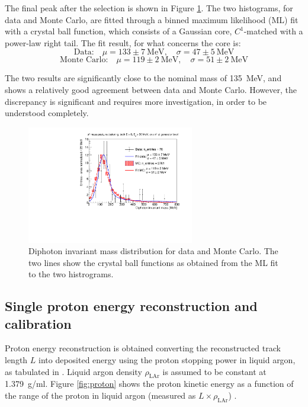 The final peak after the selection is shown in Figure \ref{fig:pi0_mass_peak}. The two histograms, for data and Monte Carlo, are fitted through a binned maximum likelihood (ML) fit with a crystal ball function, which consists of a Gaussian core, $C^1$-matched with a power-law right tail. The fit result, for what concerns the core is:
\[ \text{Data:} \quad \mu = 133 \pm 7~\text{MeV}, \quad \sigma = 47 \pm 5~\text{MeV} \]
\[ \text{Monte Carlo:} \quad \mu = 119 \pm 2~\text{MeV}, \quad \sigma = 51 \pm 2~\text{MeV} \]

The two results are significantly close to the nominal mass of 135~MeV, and shows a relatively good agreement between data and Monte Carlo. However, the discrepancy is significant and requires more investigation, in order to be understood completely.

\begin{figure}[htbp]
\centering
\includegraphics[width=0.65\textwidth]{figures/pi0_mass_peak_final.pdf}
\caption{Diphoton invariant mass distribution for data and Monte Carlo. The two lines show the crystal ball functions as obtained from the ML fit to the two histrograms.} 
\label{fig:pi0_mass_peak}
\end{figure}

\subsection{Single proton energy reconstruction and calibration}\label{sec:protonenergy}
Proton energy reconstruction is obtained converting the reconstructed track length $L$ into deposited energy using the proton stopping power in liquid argon, as tabulated in \cite{pstar}. Liquid argon density $\rho_{\mathrm{LAr}}$ is assumed to be constant at 1.379~g/ml. Figure \ref{fig:proton} shows the proton kinetic energy as a function of the range of the proton in liquid argon (measured as $L \times \rho_{\mathrm{LAr}}$) .

